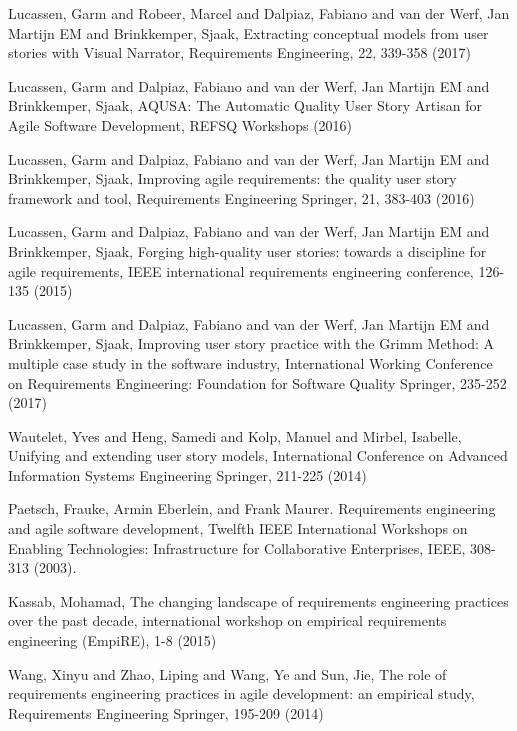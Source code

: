 \begin{thebibliography}{}
Lucassen, Garm and Robeer, Marcel and Dalpiaz, Fabiano and van der Werf, Jan Martijn EM and Brinkkemper, Sjaak, Extracting conceptual models from user stories with Visual Narrator, Requirements Engineering, 22, 339-358 (2017)

Lucassen, Garm and Dalpiaz, Fabiano and van der Werf, Jan Martijn EM and Brinkkemper, Sjaak, AQUSA: The Automatic Quality User Story Artisan for Agile Software Development, REFSQ Workshops (2016)

Lucassen, Garm and Dalpiaz, Fabiano and van der Werf, Jan Martijn EM and Brinkkemper, Sjaak, Improving agile requirements: the quality user story framework and tool, Requirements Engineering Springer, 21, 383-403 (2016)

Lucassen, Garm and Dalpiaz, Fabiano and van der Werf, Jan Martijn EM and Brinkkemper, Sjaak, Forging high-quality user stories: towards a discipline for agile requirements, IEEE international requirements engineering conference, 126-135 (2015)

Lucassen, Garm and Dalpiaz, Fabiano and van der Werf, Jan Martijn EM and Brinkkemper, Sjaak, Improving user story practice with the Grimm Method: A multiple case study in the software industry, International Working Conference on Requirements Engineering: Foundation for Software Quality Springer, 235-252 (2017)

Wautelet, Yves and Heng, Samedi and Kolp, Manuel and Mirbel, Isabelle, Unifying and extending user story models, International Conference on Advanced Information Systems Engineering Springer, 211-225 (2014)

Paetsch, Frauke, Armin Eberlein, and Frank Maurer. Requirements engineering and agile software development, Twelfth IEEE International Workshops on Enabling Technologies: Infrastructure for Collaborative Enterprises, IEEE, 308-313 (2003).



Kassab, Mohamad, The changing landscape of requirements engineering practices over the past decade, international workshop on empirical requirements engineering (EmpiRE), 1-8 (2015)

Wang, Xinyu and Zhao, Liping and Wang, Ye and Sun, Jie, The role of requirements engineering practices in agile development: an empirical study, Requirements Engineering Springer, 195-209 (2014)


\end{thebibliography}
